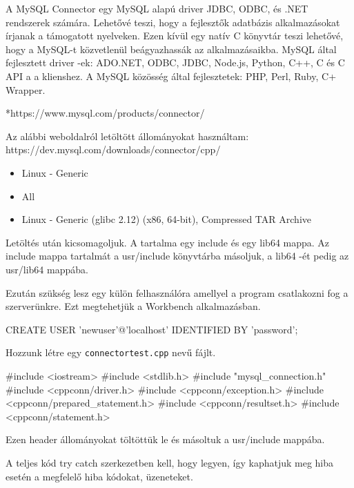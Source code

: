 
A MySQL Connector egy MySQL alapú driver JDBC, ODBC, és .NET rendszerek számára. Lehetővé teszi, hogy a fejlesztők adatbázis alkalmazásokat írjanak a támogatott nyelveken. Ezen kívül egy natív C könyvtár teszi lehetővé, hogy a MySQL-t közvetlenül beágyazhassák az alkalmazásaikba.
MySQL által fejlesztett driver -ek:
ADO.NET, ODBC, JDBC, Node.js, Python, C++, C és C API a a klienshez. 
A MySQL közösség által fejlesztetek:
PHP, Perl, Ruby, C+ Wrapper.

*https://www.mysql.com/products/connector/


Az alábbi weboldalról letöltött állományokat használtam:
https://dev.mysql.com/downloads/connector/cpp/
\begin{itemize}
\item Linux - Generic
\item All
\item Linux - Generic (glibc 2.12) (x86, 64-bit), Compressed TAR Archive
\end{itemize}

Letöltés után kicsomagoljuk. A tartalma egy include és egy lib64 mappa. Az include mappa tartalmát a usr/include könyvtárba másoljuk, a lib64 -ét pedig az usr/lib64 mappába.

Ezután szükség lesz egy külön felhasználóra amellyel a program csatlakozni fog a szerverünkre. Ezt megtehetjük a Workbench alkalmazásban.
\begin{python}
CREATE USER 'newuser'@'localhost' IDENTIFIED BY 'password';
\end{python}


Hozzunk létre egy \texttt{connectortest.cpp} nevű fájlt.
\begin{cpp}
#include <iostream>
#include <stdlib.h>
#include "mysql_connection.h"
#include <cppconn/driver.h>
#include <cppconn/exception.h>
#include <cppconn/prepared_statement.h>
#include <cppconn/resultset.h>
#include <cppconn/statement.h>
\end{cpp}
Ezen header állományokat töltöttük le és másoltuk a usr/include mappába.

A teljes kód try catch szerkezetben kell, hogy legyen, így kaphatjuk meg hiba esetén a megfelelő hiba kódokat, üzeneteket.

\begin{cpp}
  try {
    sql::Driver *driver;
    sql::Connection *con;
    sql::Statement *stmt;
    sql::ResultSet *res;
    sql::PreparedStatement *pstmt;
\end{cpp}

